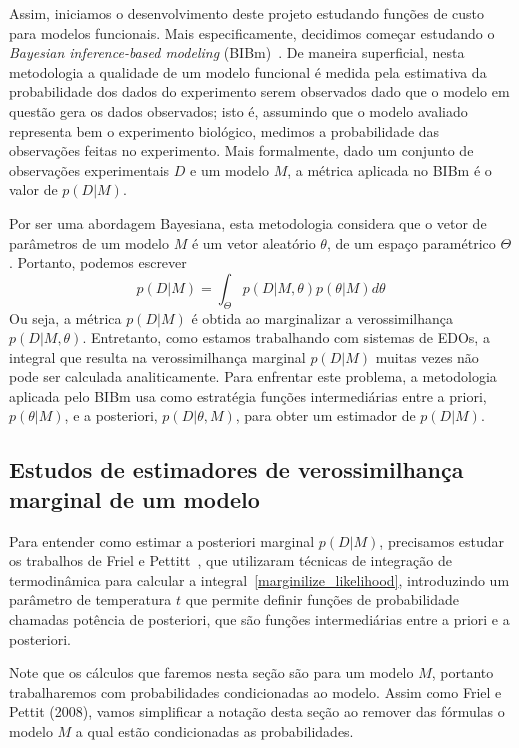 \documentclass[12pt]{article}
\begin{document}
Assim, iniciamos o desenvolvimento deste projeto estudando funções de
custo para modelos funcionais. Mais especificamente, decidimos começar
estudando o {\em Bayesian inference-based modeling} (BIBm)~\cite{Xu2010}.
De maneira superficial, nesta metodologia a qualidade de um modelo 
funcional é medida pela estimativa da probabilidade dos dados do 
experimento serem observados dado que o modelo em questão gera os dados 
observados; isto é, assumindo que o modelo avaliado representa bem o
experimento biológico, medimos a probabilidade das observações feitas
no experimento. Mais formalmente, dado um conjunto de observações
experimentais $D$ e um modelo $M$, a métrica aplicada no BIBm é o valor
de $p (D | M)$.

Por ser uma abordagem Bayesiana, esta metodologia considera que o vetor
de parâmetros de um modelo $M$ é um vetor aleatório $\theta$, de um
espaço paramétrico $\Theta$. Portanto, podemos escrever
\begin{equation}\label{marginilize_likelihood}
    p (D | M) = \int_{\Theta} p (D | M, \theta) p (\theta | M) d\theta
\end{equation}
Ou seja, a métrica $p (D|M)$ é obtida ao marginalizar a verossimilhança
$p (D | M, \theta)$. Entretanto, como estamos trabalhando com sistemas
de EDOs, a integral que resulta na verossimilhança marginal $p (D | M)$
muitas vezes não pode ser calculada analiticamente. Para enfrentar este 
problema, a metodologia aplicada pelo BIBm usa como estratégia funções 
intermediárias entre a priori, $p (\theta | M)$, e a posteriori, 
$p (D | \theta, M)$, para obter um estimador de $p (D|M)$.

\subsection{Estudos de estimadores de verossimilhança marginal de um 
modelo}\label{estudos_de_estimadores}
Para entender como estimar a posteriori marginal $p (D | M)$, 
precisamos estudar os trabalhos de Friel e Pettitt~\cite{Friel2008}, que
utilizaram técnicas de integração de termodinâmica para calcular a 
integral~\ref{marginilize_likelihood}, introduzindo um parâmetro de 
temperatura $t$ que permite definir funções de probabilidade chamadas 
potência de posteriori, que são funções intermediárias entre a priori
e a posteriori.

Note que os cálculos que faremos nesta seção são para um modelo $M$, 
portanto trabalharemos com probabilidades condicionadas ao modelo. Assim 
como Friel e Pettit (2008), vamos simplificar a notação desta seção ao 
remover das fórmulas o modelo $M$ a qual estão condicionadas as 
probabilidades.
\end{document}
